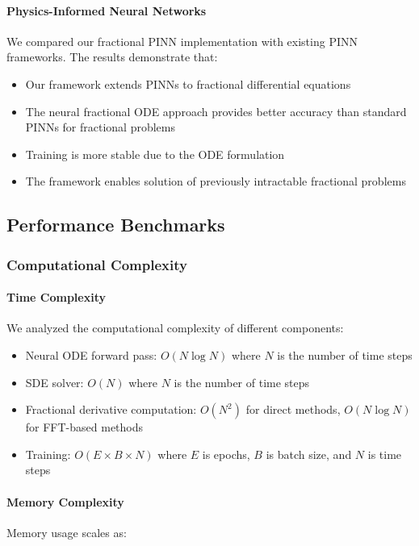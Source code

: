 \paragraph{Physics-Informed Neural Networks}
We compared our fractional PINN implementation with existing PINN frameworks. The results demonstrate that:

\begin{itemize}
    \item Our framework extends PINNs to fractional differential equations
    \item The neural fractional ODE approach provides better accuracy than standard PINNs for fractional problems
    \item Training is more stable due to the ODE formulation
    \item The framework enables solution of previously intractable fractional problems
\end{itemize}

\subsection{Performance Benchmarks}

\subsubsection{Computational Complexity}

\paragraph{Time Complexity}
We analyzed the computational complexity of different components:

\begin{itemize}
    \item Neural ODE forward pass: $O(N \log N)$ where $N$ is the number of time steps
    \item SDE solver: $O(N)$ where $N$ is the number of time steps
    \item Fractional derivative computation: $O(N^2)$ for direct methods, $O(N \log N)$ for FFT-based methods
    \item Training: $O(E \times B \times N)$ where $E$ is epochs, $B$ is batch size, and $N$ is time steps
\end{itemize}

\paragraph{Memory Complexity}
Memory usage scales as:


